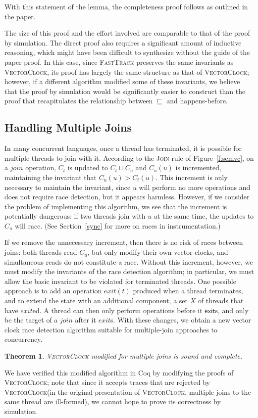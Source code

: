 \documentclass[preprint, 10pt]{sigplanconf}
\newcommand{\VCalg}{\textsc{VectorClock}\xspace}
\newcommand{\FT}{\textsc{FastTrack}\xspace}
\newcommand{\Rule}[1]{\textsc{#1}}
\newtheorem{theorem}{Theorem}
\begin{document}
\noindent With this statement of the lemma, the completeness proof follows as outlined in the paper.

The size of this proof and the effort involved are comparable to that of the proof by simulation. The direct proof also requires a significant amount of inductive reasoning, which might have been difficult to synthesize without the guide of the paper proof. In this case, since \FT preserves the same invariants as \VCalg, its proof has largely the same structure as that of \VCalg; however, if a different algorithm modified some of these invariants, we believe that the proof by simulation would be significantly easier to construct than the proof that recapitulates the relationship between $\sqsubseteq$ and happens-before.

\subsection{Handling Multiple Joins}
\label{waits}
In many concurrent languages, once a thread has terminated, it is possible for multiple threads to join with it. According to the \Rule{Join} rule of Figure~\ref{f:semvc}, on a $\mathit{join}$ operation, $C_t$ is updated to $C_t \sqcup C_u$ and $C_u(u)$ is incremented, maintaining the invariant that $C_u(u) > C_t(u)$. This increment is only necessary to maintain the invariant, since $u$ will perform no more operations and does not require race detection, but it appears harmless. However, if we consider the problem of implementing this algorithm, we see that the increment is potentially dangerous: if two threads join with $u$ at the same time, the updates to $C_u$ will race. (See Section~\ref{sync} for more on races in instrumentation.)

If we remove the unnecessary increment, then there is no risk of races between joins: both threads read $C_u$, but only modify their own vector clocks, and simultaneous reads do not constitute a race. Without this increment, however, we must modify the invariants of the race detection algorithm; in particular, we must allow the basic invariant to be violated for terminated threads. One possible approach is to add an operation $\mathit{exit}(t)$ produced when a thread terminates, and to extend the state with an additional component, a set $X$ of threads that have $\mathit{exit}$ed. A thread can then only perform operations before it $\mathsf{exit}$s, and only be the target of a $\mathit{join}$ after it $\mathit{exit}$s. With these changes, we obtain a new vector clock race detection algorithm suitable for multiple-join approaches to concurrency.
\begin{theorem}\VCalg modified for multiple joins is sound and complete.\end{theorem}
We have verified this modified algorithm in Coq by modifying the proofs of \VCalg; note that since it accepts traces that are rejected by \VCalg (in the original presentation of \VCalg, multiple joins to the same thread are ill-formed), we cannot hope to prove its correctness by simulation.
\end{document}
